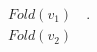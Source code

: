 \documentclass[preview]{standalone}
\begin{document}
\begin{align*}
Fold(v_1)\quad.\quad\\Fold(v_2)
\end{align*}
\end{document}

